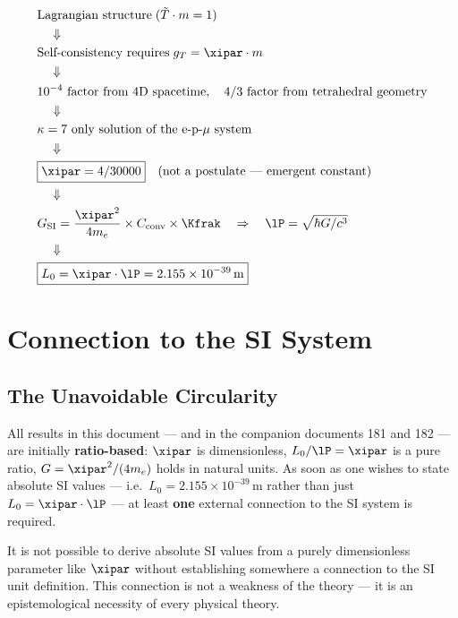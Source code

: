 \begin{keyresult}
\begin{align}
	&\text{Lagrangian structure} \; (\tilde{T} \cdot m = 1) \notag \\
	&\quad\Downarrow \notag \\
	&\text{Self-consistency requires} \; g_T = \xipar \cdot m \notag \\
	&\quad\Downarrow \notag \\
	&10^{-4}\text{ factor from 4D spacetime},\quad 4/3\text{ factor from tetrahedral geometry} \notag \\
	&\quad\Downarrow \notag \\
	&\kappa = 7 \text{ only solution of the e-p-}\mu\text{ system} \notag \\
	&\quad\Downarrow \notag \\
	&\boxed{\xipar = 4/30000} \quad \text{(not a postulate — emergent constant)} \notag \\
	&\quad\Downarrow \notag \\
	&G_{\text{SI}} = \frac{\xipar^2}{4m_e} \times C_{\text{conv}} \times \Kfrak \quad\Rightarrow\quad \lP = \sqrt{\hbar G/c^3} \notag \\
	&\quad\Downarrow \notag \\
	&\boxed{L_0 = \xipar \cdot \lP = 2{.}155 \times 10^{-39}\,\text{m}}
\end{align}
\end{keyresult}

\section{Connection to the SI System}

\subsection{The Unavoidable Circularity}

All results in this document — and in the companion documents 181 and 182 — are initially \textbf{ratio-based}: $\xipar$ is dimensionless, $L_0/\lP = \xipar$ is a pure ratio, $G = \xipar^2/(4m_e)$ holds in natural units. As soon as one wishes to state absolute SI values — i.e.\ $L_0 = 2{.}155 \times 10^{-39}\,\text{m}$ rather than just $L_0 = \xipar \cdot \lP$ — at least \textbf{one} external connection to the SI system is required.

\begin{important}
It is not possible to derive absolute SI values from a purely dimensionless parameter like $\xipar$ without establishing somewhere a connection to the SI unit definition. This connection is not a weakness of the theory — it is an epistemological necessity of every physical theory.
\end{important}

